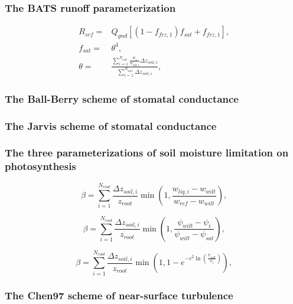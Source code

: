 \documentclass[essd]{copernicus}
\begin{document}
\subsubsection{The BATS runoff parameterization}
\begin{align}
    R_{srf} = & Q_{gnd} \left[ (1 - f_{frz,1}) f_{sat} + f_{frz,1} \right] \text{,} \\
    f_{sat} = & \theta^4 \text{,} \\
    \theta =  & \frac{\sum_{i=1}^{N_{soil}}\frac{w_i}{w_{sat,i}}\Delta z_{soil,i}}{\sum_{i=1}^{N_{soil}}\Delta z_{soil,i}} \text{,}
\end{align}




\subsubsection{The Ball-Berry scheme of stomatal conductance}


\subsubsection{The Jarvis scheme of stomatal conductance}


\subsubsection{The three parameterizations of soil moisture limitation on photosynthesis}

\begin{equation}
    \beta = \sum_{i=1}^{N_{root}} \frac{\Delta z_{soil,i}}{z_{root}}
    \min\left(1, \frac{w_{liq,i} - w_{wilt}}{w_{ref} - w_{wilt}}\right)
    \text{,}
\end{equation}

\begin{equation}
    \beta = \sum_{i=1}^{N_{root}} \frac{\Delta z_{soil,i}}{z_{root}}
    \min\left(1, \frac{\psi_{wilt} - \psi_{i}}{\psi_{wilt} - \psi_{sat}}\right)
    \text{,}
\end{equation}

\begin{equation}
    \beta = \sum_{i=1}^{N_{root}} \frac{\Delta z_{soil,i}}{z_{root}}
    \min\left(1, 1 - e^{-c^2 \ln\left(\frac{\psi_{wilt}}{\psi_{i}} \right)} \right)
    \text{,}
\end{equation}


\subsubsection{The Chen97 scheme of near-surface turbulence}
\end{document}
